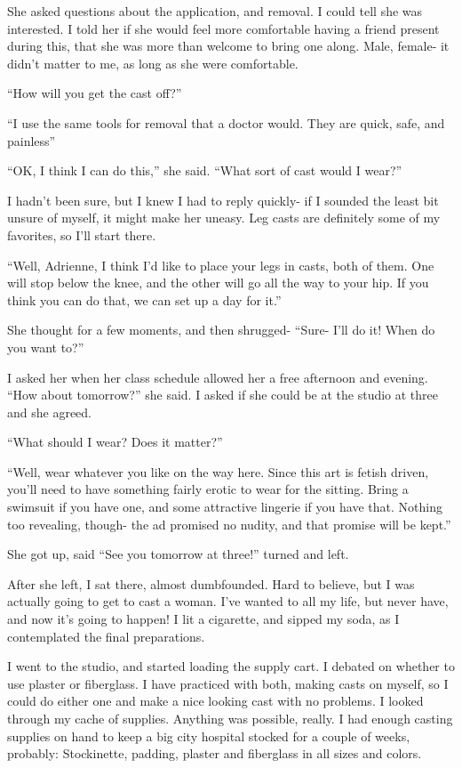 She asked questions about the application, and removal. I could tell she was interested. I
told her if she would feel more comfortable having a friend present during this, that she was
more than welcome to bring one along. Male, female- it didn't matter to me, as long as she were
comfortable.

``How will you get the cast off?''

``I use the same tools for removal that a doctor would. They are quick, safe, and painless''

``OK, I think I can do this,'' she said. ``What sort of cast would I wear?''

I hadn't been sure, but I knew I had to reply quickly- if I sounded the least bit unsure of
myself, it might make her uneasy. Leg casts are definitely some of my favorites, so I'll start
there.

``Well, Adrienne, I think I'd like to place your legs in casts, both of them. One will stop
below the knee, and the other will go all the way to your hip. If you think you can do that, we
can set up a day for it.''

She thought for a few moments, and then shrugged- ``Sure- I'll do it! When do you want to?''

I asked her when her class schedule allowed her a free afternoon and evening. ``How about
tomorrow?'' she said. I asked if she could be at the studio at three and she agreed.

``What should I wear? Does it matter?''

``Well, wear whatever you like on the way here. Since this art is fetish driven, you'll need
to have something fairly erotic to wear for the sitting. Bring a swimsuit if you have one, and
some attractive lingerie if you have that. Nothing too revealing, though- the ad promised no
nudity, and that promise will be kept.''

She got up, said ``See you tomorrow at three!'' turned and left.

After she left, I sat there, almost dumbfounded. Hard to believe, but I was actually going
to get to cast a woman. I've wanted to all my life, but never have, and now it's going to
happen! I lit a cigarette, and sipped my soda, as I contemplated the final preparations.

I went to the studio, and started loading the supply cart. I debated on whether to use
plaster or fiberglass. I have practiced with both, making casts on myself, so I could do either
one and make a nice looking cast with no problems. I looked through my cache of supplies.
Anything was possible, really. I had enough casting supplies on hand to keep a big city hospital
stocked for a couple of weeks, probably: Stockinette, padding, plaster and fiberglass in all
sizes and colors.


